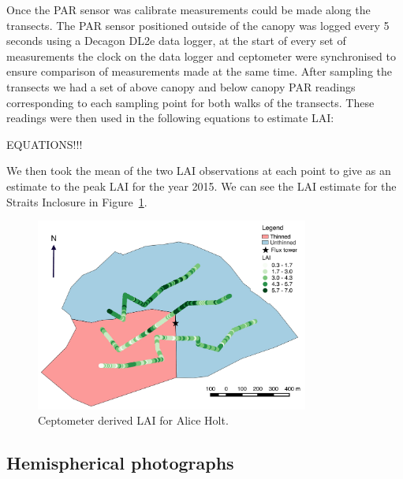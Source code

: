 \documentclass[11pt]{article}
\begin{document}
Once the PAR sensor was calibrate measurements could be made along the transects. The PAR sensor positioned outside of the canopy was logged every 5 seconds using a Decagon DL2e data logger, at the start of every set of measurements the clock on the data logger and ceptometer were synchronised to ensure comparison of measurements made at the same time. After sampling the transects we had a set of above canopy and below canopy PAR readings corresponding to each sampling point for both walks of the transects. These readings were then used in the following equations to estimate LAI:

EQUATIONS!!!

We then took the mean of the two LAI observations at each point to give as an estimate to the peak LAI for the year 2015. We can see the LAI estimate for the Straits Inclosure in Figure~\ref{fig:cept_lai}. 

\begin{figure}[ht]
    \centering
    \includegraphics[width=0.8\textwidth]{lai_cept.pdf}
    \caption{Ceptometer derived LAI for Alice Holt.} \label{fig:cept_lai}
\end{figure}

\subsection{Hemispherical photographs}
\end{document}
